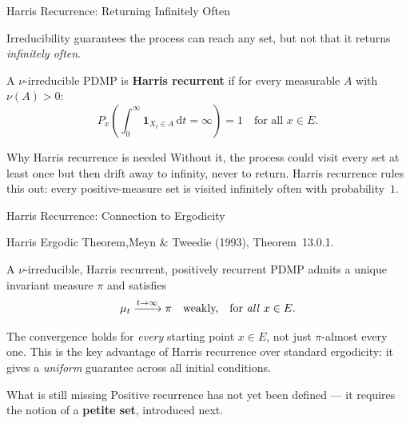 \documentclass[aspectratio=169]{beamer}
\begin{document}
\begin{frame}{Harris Recurrence: Returning Infinitely Often}

  Irreducibility guarantees the process can reach any set, but not
  that it returns \emph{infinitely often}.

  \bigskip
  \begin{definition}
    A $\nu$-irreducible PDMP is \textbf{Harris recurrent} if for
    every measurable $A$ with $\nu(A) > 0$:
    \[
      P_x\!\left(\int_0^\infty \mathbf{1}_{X_t \in A}\,\mathrm{d}t
      = \infty\right) = 1 \quad \text{for all } x \in E.
    \]
  \end{definition}

  \bigskip
  \begin{block}{Why Harris recurrence is needed}
    Without it, the process could visit every set at least once but
    then drift away to infinity, never to return. Harris recurrence
    rules this out: every positive-measure set is visited infinitely
    often with probability~$1$.
  \end{block}

\end{frame}

\begin{frame}{Harris Recurrence: Connection to Ergodicity}

  \begin{block}{Harris Ergodic Theorem,Meyn \& Tweedie (1993), Theorem~13.0.1.}

    A $\nu$-irreducible, Harris recurrent, positively recurrent PDMP
    admits a unique invariant measure $\pi$ and satisfies
    \[
      \mu_t \xrightarrow{t\to\infty} \pi \quad \text{weakly,}
      \quad \text{for \emph{all} } x \in E.
    \]
  \end{block}

    The convergence holds for \emph{every} starting point $x \in E$,
    not just $\pi$-almost every one. This is the key advantage of
    Harris recurrence over standard ergodicity: it gives a
    \emph{uniform} guarantee across all initial conditions.

  \begin{alertblock}{What is still missing}
    Positive recurrence has not yet been defined --- it requires
    the notion of a \textbf{petite set}, introduced next.
  \end{alertblock}

\end{frame}
\end{document}
